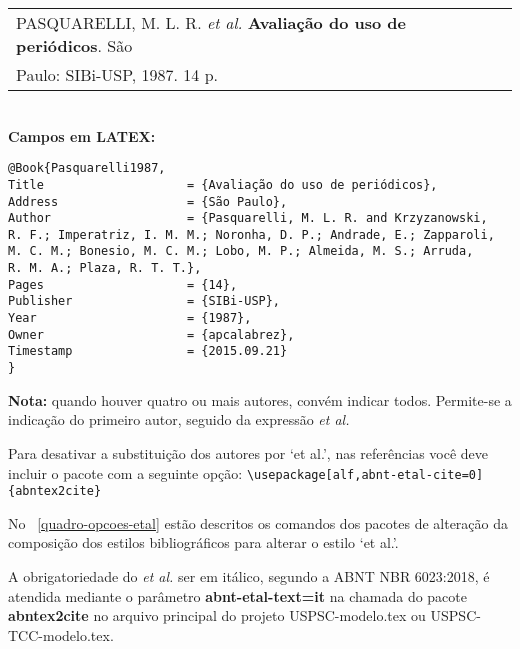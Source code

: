 \begin{tabular}{|l|c|} \hline
PASQUARELLI, M. L. R. \textit{et al.} \textbf{Avaliação do uso de periódicos}. 
São \\ Paulo: SIBi-USP, 1987. 14 p.\\\hline
\end{tabular}\\

\textbf{Campos em LATEX:}

\begin{verbatim}
@Book{Pasquarelli1987,
Title                    = {Avaliação do uso de periódicos},
Address                  = {São Paulo},
Author                   = {Pasquarelli, M. L. R. and Krzyzanowski,
R. F.; Imperatriz, I. M. M.; Noronha, D. P.; Andrade, E.; Zapparoli,
M. C. M.; Bonesio, M. C. M.; Lobo, M. P.; Almeida, M. S.; Arruda, 
R. M. A.; Plaza, R. T. T.},
Pages                    = {14},
Publisher                = {SIBi-USP},
Year                     = {1987},
Owner                    = {apcalabrez},
Timestamp                = {2015.09.21}
}
\end{verbatim}

\textbf{Nota:} quando houver quatro ou mais autores, convém indicar todos. Permite-se a indicação do primeiro autor, seguido da expressão \textit{et al.} 

Para desativar a substituição dos autores por ‘et al.’, nas referências você deve incluir o pacote com a seguinte opção: \verb+\usepackage[alf,abnt-etal-cite=0]{abntex2cite}+

No ~\autoref{quadro-opcoes-etal} estão descritos os comandos dos pacotes de alteração da composição dos estilos bibliográficos para alterar o estilo ‘et al.’.

A obrigatoriedade do \textit{et al.} ser em itálico, segundo a ABNT NBR 6023:2018, é atendida mediante o parâmetro \textbf{abnt-etal-text=it} na chamada do pacote \textbf{abntex2cite} no arquivo principal do projeto USPSC-modelo.tex ou USPSC-TCC-modelo.tex. 



